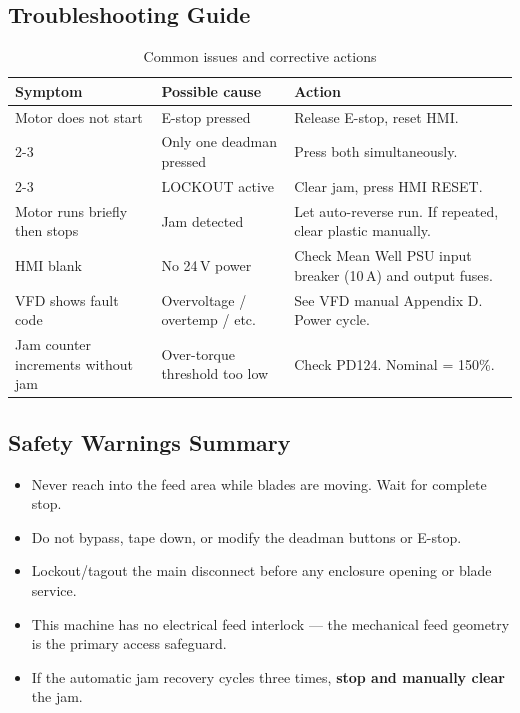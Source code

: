 \documentclass[hidelinks,12pt]{article}
\begin{document}
\subsection{Troubleshooting Guide}
\begin{table}[H]
\centering
\caption{Common issues and corrective actions}
\label{tab:troubleshooting}
\begin{tabularx}{\textwidth}{|p{2.8cm}|p{2.5cm}|X|}
\hline
\rowcolor{PSUgreen!12}\textbf{Symptom} & \textbf{Possible cause} & \textbf{Action} \\
\hline
Motor does not start & E-stop pressed & Release E-stop, reset HMI. \\
\cline{2-3}
& Only one deadman pressed & Press both simultaneously. \\
\cline{2-3}
& LOCKOUT active & Clear jam, press HMI RESET. \\
\hline
Motor runs briefly then stops & Jam detected & Let auto-reverse run. If repeated, clear plastic manually. \\
\hline
HMI blank & No 24 V power & Check Mean Well PSU input breaker (10 A) and output fuses. \\
\hline
VFD shows fault code & Overvoltage / overtemp / etc. & See VFD manual Appendix D. Power cycle. \\
\hline
Jam counter increments without jam & Over-torque threshold too low & Check PD124. Nominal = 150\%. \\
\hline
\end{tabularx}
\end{table}

\subsection{Safety Warnings Summary}
\begin{tcolorbox}[colback=red!5!white, colframe=red!70!black, title=\textbf{⚠ CRITICAL SAFETY WARNINGS}]
\begin{itemize}
    \item Never reach into the feed area while blades are moving. Wait for complete stop.
    \item Do not bypass, tape down, or modify the deadman buttons or E-stop.
    \item Lockout/tagout the main disconnect before any enclosure opening or blade service.
    \item This machine has no electrical feed interlock — the mechanical feed geometry is the primary access safeguard.
    \item If the automatic jam recovery cycles three times, \textbf{stop and manually clear} the jam.
\end{itemize}
\end{tcolorbox}
\end{document}
